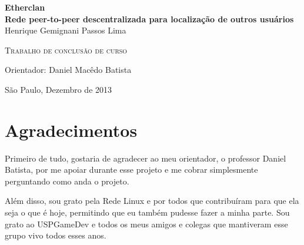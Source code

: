 \documentclass[11pt,twoside,a4paper]{book}
\begin{document}
\frontmatter 
\fancyhead[RO]{{\footnotesize\rightmark}\hspace{2em}\thepage}
\setcounter{tocdepth}{2}
\fancyhead[LE]{\thepage\hspace{2em}\footnotesize{\leftmark}}
\fancyhead[RE,LO]{}
\fancyhead[RO]{{\footnotesize\rightmark}\hspace{2em}\thepage}

\onehalfspacing  %

\thispagestyle{empty}
\begin{center}
    \vspace*{2.3cm}
    \textbf{
        {\LARGE Etherclan}\\
        \vspace*{0.5cm}
        {\Large Rede peer-to-peer descentralizada para localização de outros usuários
        }
    }\\
    
    \vspace*{1.2cm}
    \Large{Henrique Gemignani Passos Lima}
    
    \vskip 2cm
    \textsc{Trabalho de conclusão de curso} 
    
    \vskip 10cm
    Orientador: Daniel Macêdo Batista

   	\vskip 3cm
    
    \normalsize{São Paulo, Dezembro de 2013}
\end{center}


\chapter*{Agradecimentos}

Primeiro de tudo, gostaria de agradecer ao meu orientador, o professor Daniel
Batista, por me apoiar durante esse projeto e me cobrar simplesmente perguntando
como anda o projeto.

Além disso, sou grato pela Rede Linux e por todos que contribuíram para que ela seja 
o que é hoje, permitindo que eu também pudesse fazer a minha parte.
Sou grato ao USPGameDev e todos os meus amigos e colegas que mantiveram esse grupo
vivo todos esses anos.
\end{document}
